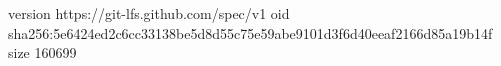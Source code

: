 version https://git-lfs.github.com/spec/v1
oid sha256:5e6424ed2c6cc33138be5d8d55c75e59abe9101d3f6d40eeaf2166d85a19b14f
size 160699
